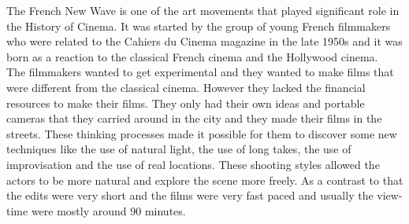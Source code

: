 \documentclass[12pt]{article}
\begin{document}
\maketitle

The French New Wave is one of the art movements that played significant role in the History of Cinema.
It was started by the group of young French filmmakers who were related to the Cahiers du Cinema magazine in the late 1950s and
it was born as a reaction to the classical French cinema and the Hollywood cinema.
\\
The filmmakers wanted to get experimental and they wanted to make films that were different from the classical cinema. However they
lacked the financial resources to make their films. They only had their own ideas and portable cameras that they carried around in the city
and they made their films in the streets. These thinking processes made it possible for them to discover some new techniques like the use of natural light,
the use of long takes, the use of improvisation and the use of real locations. These shooting styles allowed the actors to be more natural and explore the scene
more freely. As a contrast to that the edits were very short and the films were very fast paced and usually the view-time were mostly
around 90 minutes.
\\



\end{document}
